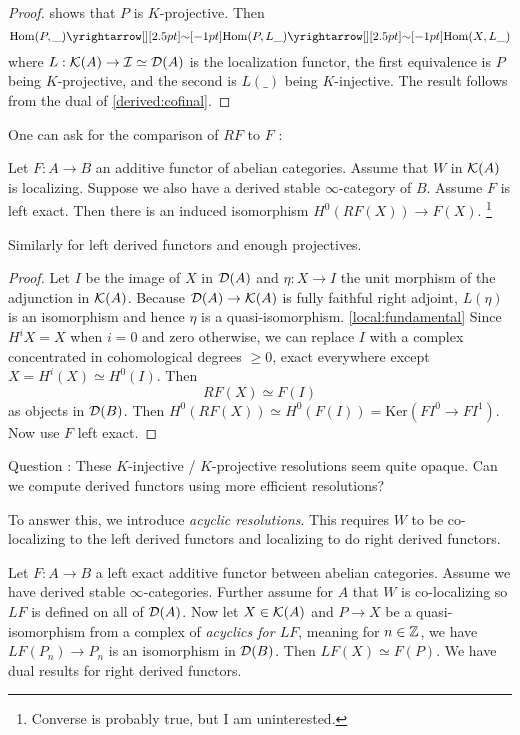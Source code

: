 \documentclass{article}
\begin{document}
\begin{proof}
  \cite[Lem. 1.3.2.20]{lurie-HA} shows that $P$ is $K$-projective.
  Then \[
    \HOM(P , \_) \map{\sim}{} \HOM(P , L \_) \map{\sim}{} \HOM(X , L \_)
  \]
  where $L : \mathcal{K}(A) \to \mathcal{I} \simeq \mathcal{D}(A)$ is the localization functor,
  the first equivalence is $P$ being $K$-projective,
  and the second is $L(\_)$ being $K$-injective.
  The result follows from the dual of \ref{derived:cofinal}.
\end{proof}

One can ask for the comparison of $RF$ to $F$ : 
\begin{prop}
  Let $F : A \to B$ an additive functor of abelian categories.
  Assume that $W$ in $\mathcal{K}(A)$ is localizing.
  Suppose we also have a derived stable $\infty$-category of $B$.
  Assume $F$ is left exact.
  Then there is an induced isomorphism $H^0(RF(X)) \to F(X)$.
  \footnote{Converse is probably true, but I am uninterested.}

  Similarly for left derived functors and enough projectives.
\end{prop}
\begin{proof}
  Let $I$ be the image of $X$ in $\mathcal{D}(A)$
  and $\eta : X \to I$ the unit morphism of the adjunction in $\mathcal{K}(A)$.
  Because $\mathcal{D}(A) \to \mathcal{K}(A)$ is fully faithful right adjoint,
  $L(\eta)$ is an isomorphism and hence $\eta$ is a quasi-isomorphism.
  \ref{local:fundamental}
  Since $H^i X = X$ when $i = 0$ and zero otherwise,
  we can replace $I$ with a complex concentrated in cohomological degrees 
  $\geq 0$, exact everywhere except $X = H^i(X) \simeq H^0(I)$.
  Then \[
    RF(X) \simeq F(I)
  \]
  as objects in $\mathcal{D}(B)$.
  Then $H^0(RF(X)) \simeq H^0(F(I)) = \mathrm{Ker}(F I^0 \to F I^1)$.
  Now use $F$ left exact.
\end{proof}
\begin{center}
  Question : These $K$-injective / $K$-projective resolutions
  seem quite opaque. Can we compute derived functors using 
  more efficient resolutions?
\end{center}
To answer this, we introduce \emph{acyclic resolutions}.
This requires $W$ to be co-localizing to the left derived functors
and localizing to do right derived functors.
\begin{prop}\label{derived:acyclic_res}
  Let $F : A \to B$ a left exact additive functor between abelian categories.
  Assume we have derived stable $\infty$-categories.
  Further assume for $A$ that $W$ is co-localizing
  so $LF$ is defined on all of $\mathcal{D}(A)$.
  Now let $X \in \mathcal{K}(A)$ and $P \to X$ be a quasi-isomorphism
  from a complex of \emph{acyclics for $LF$}, meaning 
  for $n \in \mathbb{Z}$, we have $LF(P_n) \to P_n$ is an isomorphism in $\mathcal{D}(B)$.
  Then $LF(X) \simeq F(P)$.
  We have dual results for right derived functors.
\end{prop}
\end{document}
